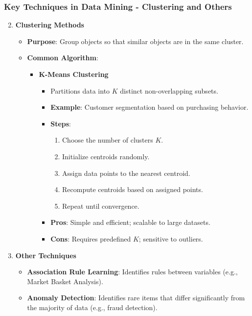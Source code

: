 \documentclass[aspectratio=169]{beamer}
\begin{document}
\begin{frame}[fragile]
    \frametitle{Key Techniques in Data Mining - Clustering and Others}
    \begin{enumerate}
        \setcounter{enumi}{1} %
        \item \textbf{Clustering Methods}
        \begin{itemize}
            \item \textbf{Purpose}: Group objects so that similar objects are in the same cluster.
            \item \textbf{Common Algorithm}:
            \begin{itemize}
                \item \textbf{K-Means Clustering}
                \begin{itemize}
                    \item Partitions data into \( K \) distinct non-overlapping subsets.
                    \item \textbf{Example}: Customer segmentation based on purchasing behavior.
                    \item \textbf{Steps}:
                    \begin{enumerate}
                        \item Choose the number of clusters \( K \).
                        \item Initialize centroids randomly.
                        \item Assign data points to the nearest centroid.
                        \item Recompute centroids based on assigned points.
                        \item Repeat until convergence.
                    \end{enumerate}
                    \item \textbf{Pros}: Simple and efficient; scalable to large datasets.
                    \item \textbf{Cons}: Requires predefined \( K \); sensitive to outliers.
                \end{itemize}
            \end{itemize}
        \end{itemize}
        
        \item \textbf{Other Techniques}
        \begin{itemize}
            \item \textbf{Association Rule Learning}: Identifies rules between variables (e.g., Market Basket Analysis).
            \item \textbf{Anomaly Detection}: Identifies rare items that differ significantly from the majority of data (e.g., fraud detection).
        \end{itemize}
    \end{enumerate}
\end{frame}
\end{document}
